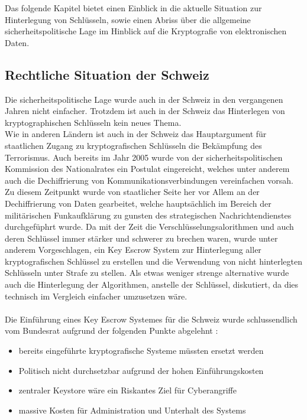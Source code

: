 
Das folgende Kapitel bietet einen Einblick in die aktuelle Situation zur Hinterlegung von Schlüsseln, sowie einen Abriss über die allgemeine sicherheitspolitische Lage im Hinblick auf die Kryptografie von elektronischen Daten.
	
	
	\subsection{Rechtliche Situation der Schweiz}

Die sicherheitspolitische Lage wurde auch in der Schweiz in den vergangenen Jahren nicht einfacher. Trotzdem ist auch in der Schweiz das Hinterlegen von kryptographischen Schlüsseln kein neues Thema. \\
Wie in anderen Ländern ist auch in der Schweiz das Hauptargument für staatlichen Zugang zu kryptografischen Schlüsseln die Bekämpfung des Terrorismus. Auch bereits im Jahr 2005 wurde von der sicherheitspolitischen Kommission des Nationalrates ein Postulat eingereicht, welches unter anderem auch die Dechiffrierung von Kommunikationsverbindungen vereinfachen vorsah. \cite{null} \\ %
Zu diesem Zeitpunkt wurde von staatlicher Seite her vor Allem an der Dechiffrierung von Daten gearbeitet, welche hauptsächlich im Bereich der militärischen Funkaufklärung zu gunsten des strategischen Nachrichtendienstes durchgefüphrt wurde. Da mit der Zeit die Verschlüsselungsalorithmen und auch deren Schlüssel immer stärker und schwerer zu brechen waren, wurde unter anderem Vorgeschlagen, ein Key Escrow System zur Hinterlegung aller kryptografischen Schlüssel zu erstellen und die Verwendung von nicht hinterlegten Schlüsseln unter Strafe zu stellen. Als etwas weniger strenge alternative wurde auch die Hinterlegung der Algorithmen, anstelle der Schlüssel, diskutiert, da dies technisch im Vergleich einfacher umzusetzen wäre. \cite{null} \\ 
\\ %
Die Einführung eines Key Escrow Systemes für die Schweiz wurde schlussendlich vom Bundesrat aufgrund der folgenden Punkte abgelehnt \cite{null}: %

\begin{itemize}
  \item bereits eingeführte kryptografische Systeme müssten ersetzt werden
  \item Politisch nicht durchsetzbar aufgrund der hohen Einführungskosten
  \item zentraler Keystore wäre ein Riskantes Ziel für Cyberangriffe
  \item massive Kosten für Administration und Unterhalt des Systems
\end{itemize}

